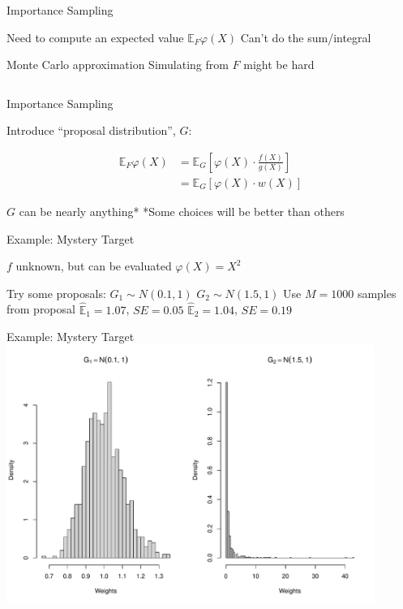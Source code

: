 \documentclass[14pt]{beamer}
\newcommand{\bE}{\mathbb{E}}
\begin{document}
\begin{frame}{Importance Sampling}
    \begin{outline}
        \1 Need to compute an expected value
            \2 $\bE_F \varphi(X)$
        \1 Can't do the sum/integral \newline

        \1 Monte Carlo approximation
            \2 Simulating from $F$ might be hard
    \end{outline}
    \begin{equation*}
    \end{equation*}
\end{frame}

\begin{frame}{Importance Sampling}
    \begin{outline}
        \1 Introduce ``proposal distribution'', $G$:
    \end{outline}
    \begin{align*}
        \bE_F \varphi(X) &=  \bE_G \left[ \varphi(X) \cdot \frac{f(X)}{g(X)} \right] \\
        &=  \bE_G \left[ \varphi(X) \cdot w(X) \right]
    \end{align*}
    \begin{outline}
        \1 $G$ can be nearly anything*
            \2 *Some choices will be better than others
    \end{outline}
\end{frame}

\begin{frame}{Example: Mystery Target}
    \begin{outline}
        \1 $f$ unknown, but can be evaluated 
        \1 $\varphi(X) = X^2$ \newline

        \1 Try some proposals:
            \2 $G_1 \sim N(0.1,1)$
            \2 $G_2 \sim N(1.5,1)$ \newline
        \1 Use $M=1000$ samples from proposal
            \2 $\hat{\bE}_1 = 1.07$, $SE = 0.05$
            \2 $\hat{\bE}_2 = 1.04$, $SE = 0.19$
    \end{outline}    
\end{frame}

\begin{frame}{Example: Mystery Target}
    \centering
    \includegraphics[height=0.9\textheight, width=0.9\textwidth, keepaspectratio]{Figures/Wt Hist.pdf}
\end{frame}
\end{document}
